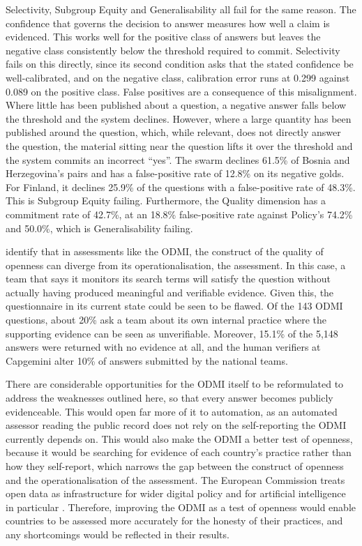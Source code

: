 Selectivity, Subgroup Equity and Generalisability all fail for the same reason. The confidence that governs the decision to answer measures how well a claim is evidenced. This works well for the positive class of answers but leaves the negative class consistently below the threshold required to commit. Selectivity fails on this directly, since its second condition asks that the stated confidence be well-calibrated, and on the negative class, calibration error runs at 0.299 against 0.089 on the positive class. False positives are a consequence of this misalignment. Where little has been published about a question, a negative answer falls below the threshold and the system declines. However, where a large quantity has been published around the question, which, while relevant, does not directly answer the question, the material sitting near the question lifts it over the threshold and the system commits an incorrect ``yes''. The swarm declines 61.5\% of Bosnia and Herzegovina's pairs and has a false-positive rate of 12.8\% on its negative golds. For Finland, it declines 25.9\% of the questions with a false-positive rate of 48.3\%. This is Subgroup Equity failing. Furthermore, the Quality dimension has a commitment rate of 42.7\%, at an 18.8\% false-positive rate against Policy's 74.2\% and 50.0\%, which is Generalisability failing.

\citet{jacobs2021} identify that in assessments like the ODMI, the construct of the quality of openness can diverge from its operationalisation, the assessment. In this case, a team that says it monitors its search terms will satisfy the question without actually having produced meaningful and verifiable evidence. Given this, the questionnaire in its current state could be seen to be flawed. Of the 143 ODMI questions, about 20\% ask a team about its own internal practice where the supporting evidence can be seen as unverifiable. Moreover, 15.1\% of the 5,148 answers were returned with no evidence at all, and the human verifiers at Capgemini alter 10\% of answers submitted by the national teams.

There are considerable opportunities for the ODMI itself to be reformulated to address the weaknesses outlined here, so that every answer becomes publicly evidenceable. This would open far more of it to automation, as an automated assessor reading the public record does not rely on the self-reporting the ODMI currently depends on. This would also make the ODMI a better test of openness, because it would be searching for evidence of each country's practice rather than how they self-report, which narrows the gap between the construct of openness and the operationalisation of the assessment. The European Commission treats open data as infrastructure for wider digital policy and for artificial intelligence in particular \citep{edp2025}. Therefore, improving the ODMI as a test of openness would enable countries to be assessed more accurately for the honesty of their practices, and any shortcomings would be reflected in their results.
